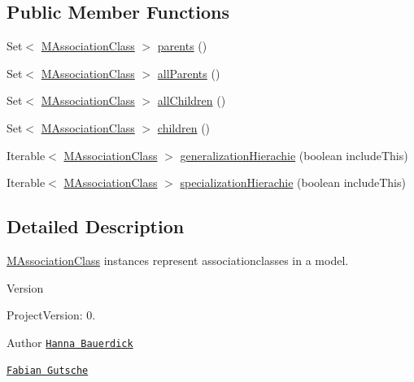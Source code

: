 \subsection*{Public Member Functions}
\begin{DoxyCompactItemize}
\item 
Set$<$ \hyperlink{interfaceorg_1_1tzi_1_1use_1_1uml_1_1mm_1_1_m_association_class}{M\-Association\-Class} $>$ \hyperlink{interfaceorg_1_1tzi_1_1use_1_1uml_1_1mm_1_1_m_association_class_a797114708244ade9f07d9163f9ead7f7}{parents} ()
\item 
Set$<$ \hyperlink{interfaceorg_1_1tzi_1_1use_1_1uml_1_1mm_1_1_m_association_class}{M\-Association\-Class} $>$ \hyperlink{interfaceorg_1_1tzi_1_1use_1_1uml_1_1mm_1_1_m_association_class_a3282f7d08b28f212b1a0149378d5a2a1}{all\-Parents} ()
\item 
Set$<$ \hyperlink{interfaceorg_1_1tzi_1_1use_1_1uml_1_1mm_1_1_m_association_class}{M\-Association\-Class} $>$ \hyperlink{interfaceorg_1_1tzi_1_1use_1_1uml_1_1mm_1_1_m_association_class_a853a3b592b0721bde9e9d7c286977481}{all\-Children} ()
\item 
Set$<$ \hyperlink{interfaceorg_1_1tzi_1_1use_1_1uml_1_1mm_1_1_m_association_class}{M\-Association\-Class} $>$ \hyperlink{interfaceorg_1_1tzi_1_1use_1_1uml_1_1mm_1_1_m_association_class_a87a617864d5e1c587589e952762a463f}{children} ()
\item 
Iterable$<$ \hyperlink{interfaceorg_1_1tzi_1_1use_1_1uml_1_1mm_1_1_m_association_class}{M\-Association\-Class} $>$ \hyperlink{interfaceorg_1_1tzi_1_1use_1_1uml_1_1mm_1_1_m_association_class_a8aa6e8196cbb20e7e071c236e5eaaa97}{generalization\-Hierachie} (boolean include\-This)
\item 
Iterable$<$ \hyperlink{interfaceorg_1_1tzi_1_1use_1_1uml_1_1mm_1_1_m_association_class}{M\-Association\-Class} $>$ \hyperlink{interfaceorg_1_1tzi_1_1use_1_1uml_1_1mm_1_1_m_association_class_ae5e755e01a6d8e4db34bdaf9d015655f}{specialization\-Hierachie} (boolean include\-This)
\end{DoxyCompactItemize}


\subsection{Detailed Description}
\hyperlink{interfaceorg_1_1tzi_1_1use_1_1uml_1_1mm_1_1_m_association_class}{M\-Association\-Class} instances represent associationclasses in a model.

\begin{DoxyVersion}{Version}

\end{DoxyVersion}
\begin{DoxyParagraph}{Project\-Version\-:}
0. 
\end{DoxyParagraph}
\begin{DoxyAuthor}{Author}
\href{mailto:hanna@tzi.de}{\tt Hanna Bauerdick} 

\href{mailto:gutsche@tzi.de}{\tt Fabian Gutsche} 
\end{DoxyAuthor}


